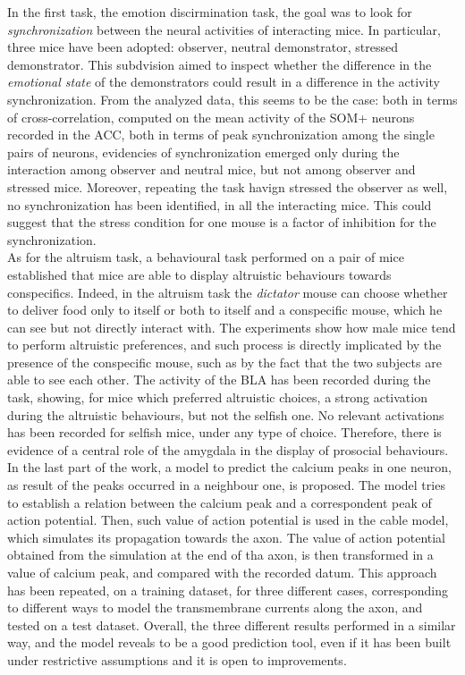 \documentclass[12pt, a4paper]{report}
\begin{document}
In the first task, the emotion discirmination task, the goal was to look for \textit{synchronization} between the neural activities of interacting mice. In particular, three mice have been adopted: observer, neutral demonstrator, stressed demonstrator. This subdvision aimed to inspect whether the difference in the \textit{emotional state} of the demonstrators could result in a difference in the activity synchronization. From the analyzed data, this seems to be the case: both in terms of cross-correlation, computed on the mean activity of the SOM+ neurons recorded in the ACC, both in terms of peak synchronization among the single pairs of neurons, evidencies of synchronization emerged only during the interaction among  observer and  neutral mice, but not among  observer and  stressed mice. Moreover, repeating the task havign stressed the observer as well, no synchronization has been identified, in all the interacting mice.
This could suggest that the stress condition for one mouse is a factor of inhibition for the synchronization. \\

As for the altruism task, a behavioural task performed on a pair of mice established that mice are able to display altruistic behaviours towards conspecifics. Indeed, in the altruism task the \textit{dictator} mouse can choose whether to deliver food only to itself or both to itself and a conspecific mouse, which he can see but not directly interact with. The experiments show how male mice tend to perform altruistic preferences, and such process is directly implicated by the presence of the conspecific mouse, such as by the fact that the two subjects are able to see each other. The activity of the BLA has been recorded during the task, showing, for mice which preferred altruistic choices, a strong activation during the altruistic behaviours, but not the selfish one. No relevant activations has been recorded for selfish mice, under any type of choice. Therefore, there is evidence of a central role of the amygdala in the display of prosocial behaviours.\\

In the last part of the work, a model to predict the calcium peaks in one neuron, as result of the peaks occurred in a neighbour one, is proposed. The model tries to establish a relation between the calcium peak and a correspondent peak of action potential. Then, such value of action potential is used in the cable model, which simulates its propagation towards the axon. The value of action potential obtained from the simulation at the end of tha axon, is then transformed in a value of calcium peak, and compared with the recorded datum. This approach has been repeated, on a training dataset, for three different cases, corresponding to different ways to model the transmembrane currents along the axon, and tested on a test dataset. Overall, the three different results performed in a similar way, and the model reveals to be a good prediction tool, even if it has been built under restrictive assumptions and it is open to improvements.\\
\end{document}
